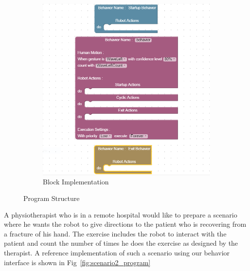 \documentclass{llncs}
\begin{document}
\begin{figure}
\begin{subfigure}[t]{0.48\textwidth}
\includegraphics[width=\textwidth]{../thesis/assets/program_block.png}
\caption[Block Implementation]{Block Implementation}
\label{fig:scenario2_setup}
\end{subfigure}
\caption[Program Structure]{Program Structure}
\label{fig:program}
\end{figure}
A physiotherapist who is in a remote hospital would like to prepare a scenario where he wants the robot to give directions to the patient who is recovering from a fracture of his hand. The exercise includes the robot to interact with the patient and count the number of times he does the exercise as designed by the therapist. A reference implementation of such a scenario using our behavior interface is shown in Fig~\ref{fig:scenario2_program}
%
\end{document}
